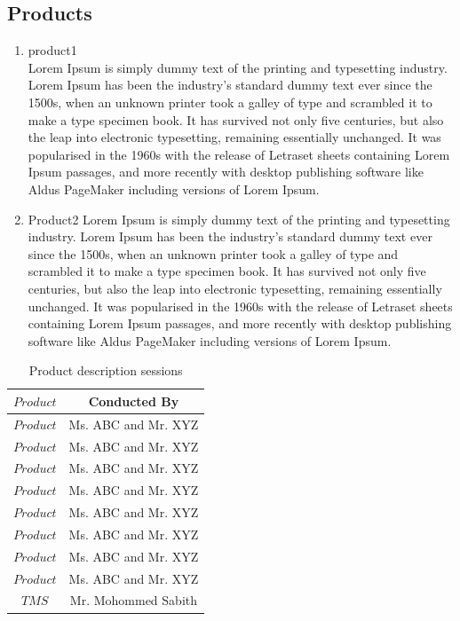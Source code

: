 \documentclass[12pt,a4paper]{report}
\begin{document}
\subsection*{Products}
\begin{enumerate}
\item product1 \\
Lorem Ipsum is simply dummy text of the printing and typesetting industry. Lorem Ipsum has been the industry's standard dummy text ever since the 1500s, when an unknown printer took a galley of type and scrambled it to make a type specimen book. It has survived not only five centuries, but also the leap into electronic typesetting, remaining essentially unchanged. It was popularised in the 1960s with the release of Letraset sheets containing Lorem Ipsum passages, and more recently with desktop publishing software like Aldus PageMaker including versions of Lorem Ipsum.
\item Product2
Lorem Ipsum is simply dummy text of the printing and typesetting industry. Lorem Ipsum has been the industry's standard dummy text ever since the 1500s, when an unknown printer took a galley of type and scrambled it to make a type specimen book. It has survived not only five centuries, but also the leap into electronic typesetting, remaining essentially unchanged. It was popularised in the 1960s with the release of Letraset sheets containing Lorem Ipsum passages, and more recently with desktop publishing software like Aldus PageMaker including versions of Lorem Ipsum.
\end{enumerate}


\begin{table}[!ht]
   \centering   \begin{tabular}{| c || c |}\hline \label{tbl:Product Explaining Sessions} 
		$Product$ & Conducted By \\ \hline
		$Product$ & Ms. ABC and Mr. XYZ\\
		$Product$ & Ms. ABC and Mr. XYZ\\
		$Product$ & Ms. ABC and Mr. XYZ\\
		$Product$ & Ms. ABC and Mr. XYZ\\
		$Product$ & Ms. ABC and Mr. XYZ\\
		$Product$ & Ms. ABC and Mr. XYZ\\
		$Product$ & Ms. ABC and Mr. XYZ\\
		$Product$ & Ms. ABC and Mr. XYZ\\
		$TMS$ & Mr. Mohommed Sabith\\ \hline
	\end{tabular}
   \caption{Product description sessions}
   \label{tab:ProductDescription}
\end{table}
\end{document}

